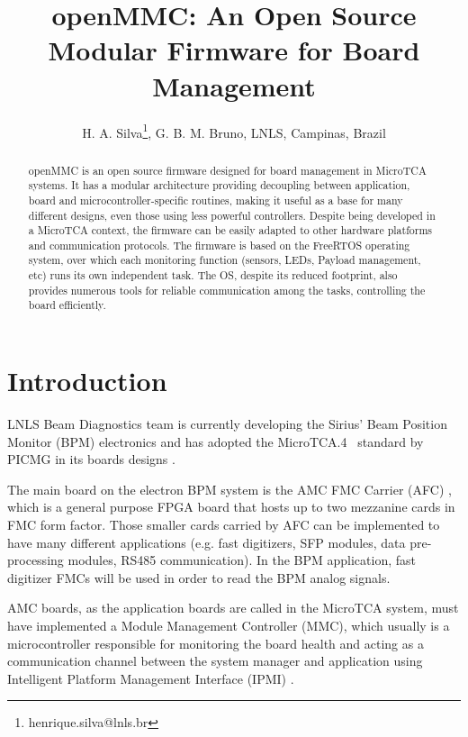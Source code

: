 \documentclass[a4paper,
              ]{jacow}
\begin{document}
\title{openMMC: An Open Source Modular Firmware for Board Management}

\author{H. A. Silva\thanks{henrique.silva@lnls.br}, G. B. M. Bruno, LNLS, Campinas, Brazil}

\maketitle

%
\begin{abstract}
  openMMC is an open source firmware designed for board management in MicroTCA systems.
  It has a modular architecture providing decoupling between application,
  board and microcontroller-specific routines, making it useful as a base for many
  different designs, even those using less powerful controllers.
  Despite being developed in a MicroTCA context, the firmware can be easily adapted
  to other hardware platforms and communication protocols.
  The firmware is based on the FreeRTOS operating system, over which each monitoring function
  (sensors, LEDs, Payload management, etc) runs its own independent task.
  The OS, despite its reduced footprint, also provides numerous tools for reliable
  communication among the tasks, controlling the board efficiently.
\end{abstract}

\section{Introduction}

LNLS Beam Diagnostics team is currently developing the Sirius' Beam Position Monitor (BPM) electronics and has adopted the MicroTCA.4\textregistered~ standard by PICMG \cite{picmg-mtca} in its boards designs \cite{bpm-electronic-spec}.

The main board on the electron BPM system is the AMC FMC Carrier (AFC) \cite{afc-ohwr}, which is a general purpose FPGA board that hosts up to two mezzanine cards in FMC form factor.
Those smaller cards carried by AFC can be implemented to have many different applications (e.g. fast digitizers, SFP modules, data pre-processing modules, RS485 communication). In the BPM application, fast digitizer FMCs will be used in order to read the BPM analog signals.

AMC boards, as the application boards are called in the MicroTCA system, must have implemented a Module Management Controller (MMC), which usually is a microcontroller responsible for monitoring the board health and acting as a communication channel between the system manager and application using Intelligent Platform Management Interface (IPMI) \cite{ipmi}.
\end{document}
